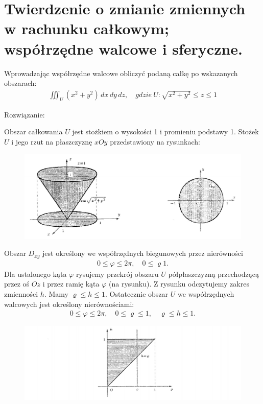 \documentclass[12pt]{article}
\begin{document}
    \section{Twierdzenie o zmianie zmiennych w rachunku całkowym; współrzędne walcowe i sferyczne.}

    \begin{exercise}
        Wprowadzając współrzędne walcowe obliczyć podaną całkę po wskazanych obszarach:
        \begin{align*}
            \iiint_U (x^2+y^2) \,dx\,dy\,dz, \quad gdzie \ U: \sqrt{x^2+y^2} \leq z \leq 1 
        \end{align*}
    \end{exercise}
    
    Rozwiązanie:
    
    Obszar całkowania $U$ jest stożkiem o wysokości 1 i promieniu podstawy 1. Stożek $U$ i jego rzut na płaszczyznę $xOy$ przedstawiony na rysunkach:
    \begin{figure}[H]
        \includegraphics[width=\linewidth]{28_1a.jpg}
    \end{figure}
    
    Obszar $D_{xy}$ jest określony we współrzędnych biegunowych przez nierówności
    \begin{align*}
        0 \leq \varphi \leq 2\pi, \quad 0 \leq \varrho 1 .
    \end{align*}
    Dla ustalonego kąta $\varphi$ rysujemy przekrój obszaru $U$ półpłaszczyzną przechodzącą przez oś $Oz$ i przez ramię kąta $\varphi$ (na rysunku). Z rysunku odczytujemy zakres zmienności $h$. Mamy $\varrho \leq h \leq 1$. Ostatecznie obszar $U$ we współrzędnych walcowych jest określony nierównościami:
    \begin{align*}
        0 \leq \varphi \leq 2\pi, \quad 0 \leq \varrho \leq 1, \quad \varrho \leq h \leq 1.
    \end{align*}
    
    \begin{figure}[H]
        \includegraphics[width=\linewidth]{28_1b.jpg}
    \end{figure}
    
\end{document}

